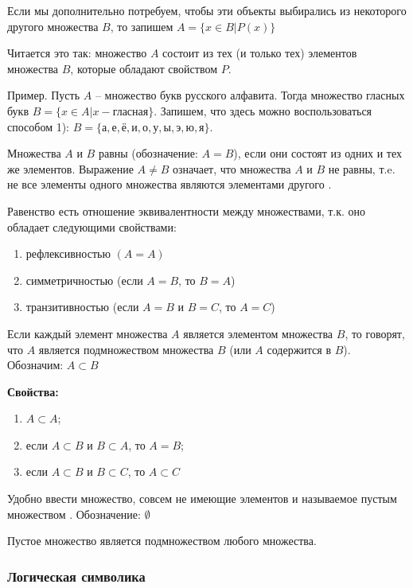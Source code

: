\documentclass[12pt, a4paper]{article}
\begin{document}
    Если мы дополнительно потребуем, чтобы эти объекты выбирались из некоторого 
    другого множества $B$, то запишем $A = \{ x \in B | P(x)\}$

    Читается это так: множество $A$ состоит из тех (и только тех) элементов 
    множества $B$, которые обладают свойством $P$.

    Пример. Пусть $A$ -- множество букв русского алфавита. Тогда множество 
    гласных букв $B = \{x \in A | x - \text{гласная}\}$. Запишем, что здесь 
    можно воспользоваться способом 1): $B = \{\text{а}, \text{е}, \text{ё}, 
    \text{и}, \text{о}, \text{у}, \text{ы}, \text{э}, \text{ю}, \text{я}\}$.
    
    Множества $A$ и $B$ равны (обозначение: $A = B$), если они состоят из 
    одних и тех же элементов. Выражение $A \neq  B$ означает, что множества 
    $A$ и $B$ не равны, т.e. не все элементы одного множества являются 
    элементами другого .

    Равенство есть отношение эквивалентности между множествами, т.к. оно 
    обладает следующими свойствами:
    \begin{enumerate}
        \item рефлексивностью $(A = A)$
        \item симметричностью (если $A = B$, то $B = A$)
        \item транзитивностью (если $A = B$ и $B = C$, то $A = C$)
    \end{enumerate}

    Если каждый элемент множества $A$ является элементом множества 
    $B$, то говорят, что $A$ является подмножеством множества $B$ 
    (или $A$ содержится в $B$). Обозначим: $A \subset B$

    \textbf{Свойства:}
    \begin{enumerate}
        \item $A \subset A$;
        \item если $A \subset B$ и $B \subset A$, то $A = B$;
        \item если $A \subset B$ и $B \subset C$, то $A \subset C$
    \end{enumerate}

    Удобно ввести множество, совсем не имеющие элементов и 
    называемое пустым множеством . Обозначение: $\emptyset$
    
    Пустое множество является подмножеством любого множества.

    \subsubsection{Логическая символика}
\end{document}
